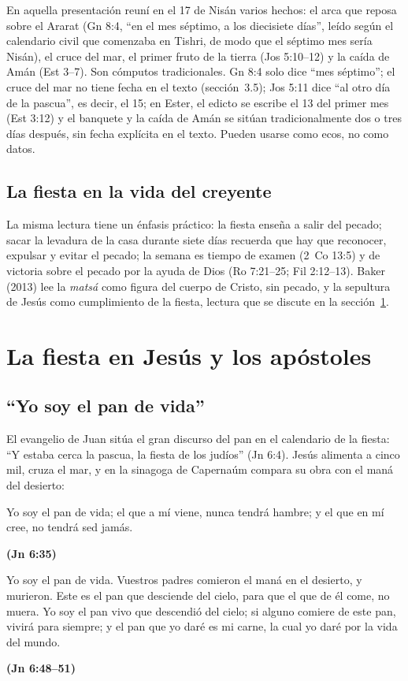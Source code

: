 \documentclass[11pt,letterpaper]{article}
\newcommand{\grc}[1]{\foreignlanguage{ancientgreek}{#1}}
\newcommand{\fuente}[1]{\par\hfill{\upshape\bfseries\small\textcolor{tierraroja}{#1}}}
\begin{document}
\begin{nota}
En aquella presentación reuní en el 17 de Nisán varios hechos: el arca que reposa sobre el Ararat (Gn 8:4, ``en el mes séptimo, a los diecisiete días'', leído según el calendario civil que comenzaba en Tishri, de modo que el séptimo mes sería Nisán), el cruce del mar, el primer fruto de la tierra (Jos 5:10--12) y la caída de Amán (Est 3--7). Son cómputos tradicionales. Gn 8:4 solo dice ``mes séptimo''; el cruce del mar no tiene fecha en el texto (sección~3.5); Jos 5:11 dice ``al otro día de la pascua'', es decir, el 15; en Ester, el edicto se escribe el 13 del primer mes (Est 3:12) y el banquete y la caída de Amán se sitúan tradicionalmente dos o tres días después, sin fecha explícita en el texto. Pueden usarse como ecos, no como datos.
\end{nota}

\subsection{La fiesta en la vida del creyente}
La misma lectura tiene un énfasis práctico: la fiesta enseña a salir del pecado; sacar la levadura de la casa durante siete días recuerda que hay que reconocer, expulsar y evitar el pecado; la semana es tiempo de examen (2~Co 13:5) y de victoria sobre el pecado por la ayuda de Dios (Ro 7:21--25; Fil 2:12--13). Baker (2013) lee la \emph{matsá} como figura del cuerpo de Cristo, sin pecado, y la sepultura de Jesús como cumplimiento de la fiesta, lectura que se discute en la sección~\ref{sec:mesias}.

\section{La fiesta en Jesús y los apóstoles}\label{sec:mesias}

\subsection{``Yo soy el pan de vida''}
El evangelio de Juan sitúa el gran discurso del pan en el calendario de la fiesta: ``Y estaba cerca la pascua, la fiesta de los judíos'' (Jn 6:4). Jesús alimenta a cinco mil, cruza el mar, y en la sinagoga de Capernaúm compara su obra con el maná del desierto:

\par\smallskip{\centering\large\grc{ἐγώ εἰμι ὁ ἄρτος τῆς ζωῆς}\par}\smallskip
\begin{cita}Yo soy el pan de vida; el que a mí viene, nunca tendrá hambre; y el que en mí cree, no tendrá sed jamás.\fuente{(Jn 6:35)}\end{cita}
\begin{cita}Yo soy el pan de vida. Vuestros padres comieron el maná en el desierto, y murieron. Este es el pan que desciende del cielo, para que el que de él come, no muera. Yo soy el pan vivo que descendió del cielo; si alguno comiere de este pan, vivirá para siempre; y el pan que yo daré es mi carne, la cual yo daré por la vida del mundo.\fuente{(Jn 6:48--51)}\end{cita}
\end{document}

